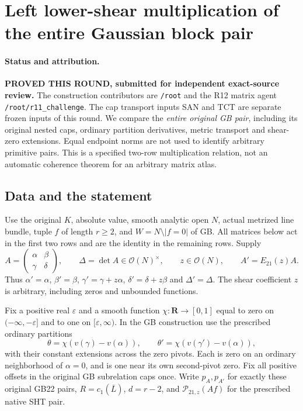 \section{Left lower-shear multiplication of the entire Gaussian block pair}
\label{sec:r12-gaussian-lower-triangular-multiplication}

\paragraph{Status and attribution.}
\textbf{PROVED THIS ROUND, submitted for independent exact-source review.}
The construction contributors are \texttt{/root} and the R12 matrix
agent \texttt{/root/r11\_challenge}.  The cap transport inputs SAN
and TCT are separate frozen inputs of this round.  We compare the
\emph{entire original GB pair}, including its original nested caps,
ordinary partition derivatives, metric transport and shear-zero
extensions.  Equal endpoint norms are not used to identify arbitrary
primitive pairs.  This is a specified two-row multiplication relation,
not an automatic coherence theorem for an arbitrary matrix atlas.

\subsection{Data and the statement}

Use the original $K$, absolute value, smooth analytic open $N$, actual
metrized line bundle, tuple $f$ of length $r\ge2$, and
$W=N\setminus|f=0|$ of GB.  All matrices below act in the first two
rows and are the identity in the remaining rows.  Supply
\[
 A=\begin{pmatrix}\alpha&\beta\\\gamma&\delta\end{pmatrix},
 \qquad \Delta=\det A\in\mathcal O(N)^\times,
 \qquad z\in\mathcal O(N),\qquad
 A'=E_{21}(z)A.
 \tag{TML1}
\]
Thus $\alpha'=\alpha$, $\beta'=\beta$, $\gamma'=\gamma+z\alpha$,
$\delta'=\delta+z\beta$ and $\Delta'=\Delta$.  The shear coefficient
$z$ is arbitrary, including zeros and unbounded functions.

Fix a positive real $\varepsilon$ and a smooth function
$\chi:\mathbf R\to[0,1]$ equal to zero on $(-\infty,-\varepsilon]$
and to one on $[\varepsilon,\infty)$.  In the GB construction use
the prescribed ordinary partitions
\[
 \theta=\chi(v(\gamma)-v(\alpha)),\qquad
 \theta'=\chi(v(\gamma')-v(\alpha)),
 \tag{TML2}
\]
with their constant extensions across the zero pivots.  Each is zero
on an ordinary neighborhood of $\alpha=0$, and is one near its own
second-pivot zero.  Fix all positive offsets in the original GB
subrelation caps once.  Write $p_A,p_{A'}$ for exactly these original
GB22 pairs, $R=c_1(\overline L)$, $d=r-2$, and
$\mathcal P_{21,z}(Af)$ for the prescribed native SHT pair.


